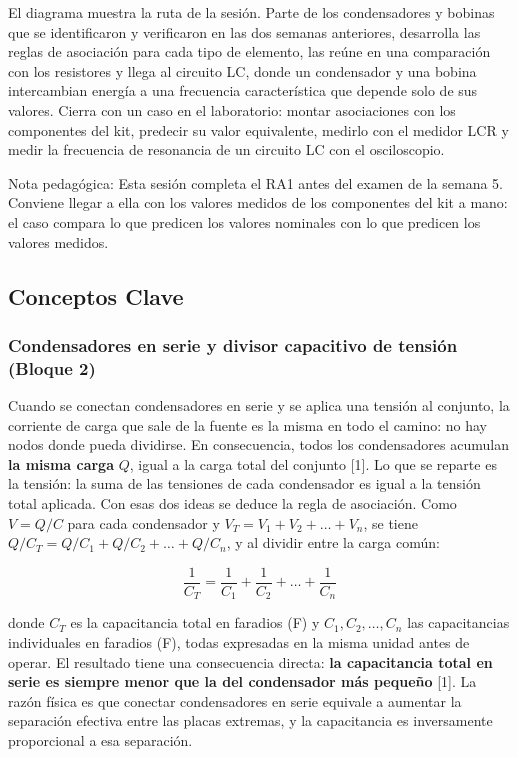 \documentclass[11pt,letterpaper]{article}
\begin{document}
El diagrama muestra la ruta de la sesión. Parte de los condensadores y bobinas que se identificaron y verificaron en las dos semanas anteriores, desarrolla las reglas de asociación para cada tipo de elemento, las reúne en una comparación con los resistores y llega al circuito LC, donde un condensador y una bobina intercambian energía a una frecuencia característica que depende solo de sus valores. Cierra con un caso en el laboratorio: montar asociaciones con los componentes del kit, predecir su valor equivalente, medirlo con el medidor LCR y medir la frecuencia de resonancia de un circuito LC con el osciloscopio.

\begin{nota}{Nota pedagógica:}
Esta sesión completa el RA1 antes del examen de la semana 5. Conviene llegar a ella con los valores medidos de los componentes del kit a mano: el caso compara lo que predicen los valores nominales con lo que predicen los valores medidos.
\end{nota}

\subsection{Conceptos Clave}

\subsubsection{Condensadores en serie y divisor capacitivo de tensión (Bloque 2)}

Cuando se conectan condensadores en serie y se aplica una tensión al conjunto, la corriente de carga que sale de la fuente es la misma en todo el camino: no hay nodos donde pueda dividirse. En consecuencia, todos los condensadores acumulan \textbf{la misma carga} $Q$, igual a la carga total del conjunto [1]. Lo que se reparte es la tensión: la suma de las tensiones de cada condensador es igual a la tensión total aplicada. Con esas dos ideas se deduce la regla de asociación. Como $V = Q/C$ para cada condensador y $V_T = V_1 + V_2 + \dots + V_n$, se tiene $Q/C_T = Q/C_1 + Q/C_2 + \dots + Q/C_n$, y al dividir entre la carga común:

\begin{equation}
  \frac{1}{C_T} = \frac{1}{C_1} + \frac{1}{C_2} + \dots + \frac{1}{C_n}
\end{equation}

donde $C_T$ es la capacitancia total en faradios (F) y $C_1, C_2, \dots, C_n$ las capacitancias individuales en faradios (F), todas expresadas en la misma unidad antes de operar. El resultado tiene una consecuencia directa: \textbf{la capacitancia total en serie es siempre menor que la del condensador más pequeño} [1]. La razón física es que conectar condensadores en serie equivale a aumentar la separación efectiva entre las placas extremas, y la capacitancia es inversamente proporcional a esa separación.
\end{document}
